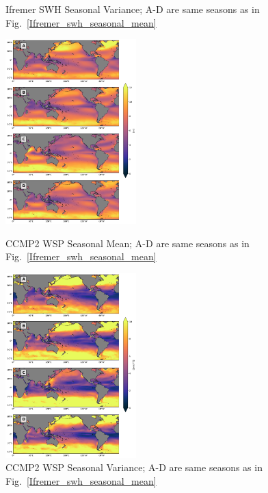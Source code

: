 \documentclass[12pt,twoside]{article}
\begin{document}
\begin{figure}[tbh]
\begin{minipage}{.5\textwidth}
    \caption{Ifremer SWH Seasonal Variance; A-D are same seasons as in Fig.~\ref{Ifremer_swh_seasonal_mean}}
    \label{Ifremer_swh_seasonal_var}
\end{minipage}
\label{Ifremer_swh_seasonal_pro}
\end{figure}

\begin{figure}[tbh]
  \begin{minipage}{.5\textwidth}
    \centering
    \includegraphics[width=0.45\textwidth]{figs/statistical_moments/CCMP2_seasonal_mean_wsp.png}
    \caption{CCMP2 WSP Seasonal Mean; A-D are same seasons as in Fig.~\ref{Ifremer_swh_seasonal_mean}}
    \label{CCMP2_wsp_seasonal_mean}
  \end{minipage}
  \begin{minipage}{.5\textwidth}
    \centering
    \includegraphics[width=0.45\textwidth]{figs/statistical_moments/CCMP2_seasonal_var_wsp.png}
    \caption{CCMP2 WSP Seasonal Variance; A-D are same seasons as in Fig.~\ref{Ifremer_swh_seasonal_mean}}
    \label{CCMP2_wsp_seasonal_var}
  \end{minipage}
\label{ccmp2_wsp_seasonal_pro}
\end{figure}
\end{document}
